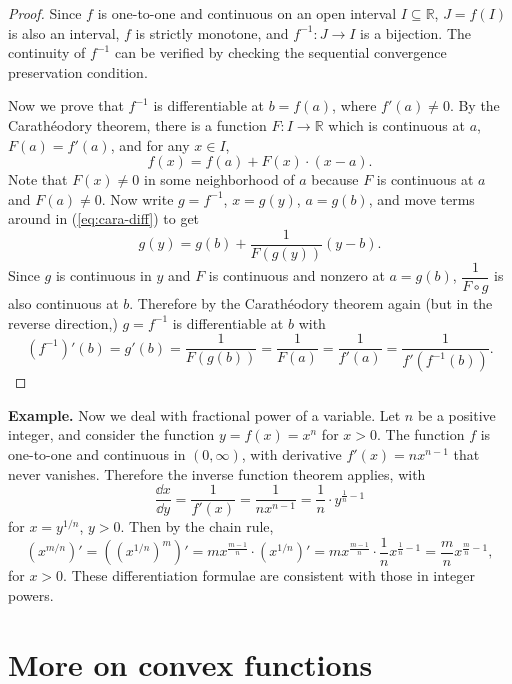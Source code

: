 \begin{proof}
  Since $f$ is one-to-one and continuous on an open interval $I \subseteq \mathbb{R}$,
  $J = f(I)$ is also an interval, $f$ is strictly monotone, and $f^{-1} : J \to I$ is a bijection.
  The continuity of $f^{-1}$ can be verified by checking the sequential convergence preservation condition.

  Now we prove that $f^{-1}$ is differentiable at $b = f(a)$, where $f'(a) \ne 0$.
  By the Carath\'eodory theorem, there is a function $F: I \to \mathbb{R}$ which is continuous at $a$, $F(a) = f'(a)$, and for any $x \in I$,
  \begin{equation}
    \label{eq:cara-diff}
    f(x) = f(a) + F(x) \cdot (x-a).
  \end{equation}
  Note that $F(x) \ne 0$ in some neighborhood of $a$ because $F$ is continuous at $a$ and $F(a) \ne 0$.
  Now write $g = f^{-1}$, $x = g(y)$, $a = g(b)$, and move terms around in (\ref{eq:cara-diff}) to get
  \begin{equation}
    \label{eq:cara-diff2}
    g(y) = g(b) + \frac{1}{F(g(y))} (y - b).
  \end{equation}
  Since $g$ is continuous in $y$ and $F$ is continuous and nonzero at $a = g(b)$, $\dfrac{1}{F \circ g}$ is also continuous at $b$.
  Therefore by the Carath\'eodory theorem again (but in the reverse direction,) $g = f^{-1}$ is differentiable at $b$ with
  \[
    (f^{-1})'(b) = g'(b) = \frac{1}{F(g(b))} = \frac{1}{F(a)} = \frac{1}{f'(a)} = \frac{1}{f'(f^{-1}(b))}.
  \]
\end{proof}

\noindent\textbf{Example.} Now we deal with fractional power of a variable.
Let $n$ be a positive integer, and consider the function $y = f(x) = x^n$ for $x > 0$.
The function $f$ is one-to-one and continuous in $(0, \infty)$, with derivative $f'(x) = n x^{n-1}$ that never vanishes.
Therefore the inverse function theorem applies, with
\[
\frac{\dd x}{\dd y} = \frac{1}{f'(x)} = \frac{1}{n x^{n-1}} = \frac{1}{n} \cdot y^{\frac{1}{n}-1}
\]
for $x = y^{1/n}$, $y > 0$.
Then by the chain rule,
\[
  (x^{m/n})' = ( (x^{1/n})^m )' = m x^{\frac{m-1}{n}} \cdot (x^{1/n})'
  = m x^{\frac{m-1}{n}} \cdot \frac{1}{n} x^{\frac{1}{n}-1} 
  = \frac{m}{n} x^{\frac{m}{n} - 1},
\]
for $x > 0$.
These differentiation formulae are consistent with those in integer powers.

\section{More on convex functions}
\label{sec:convex-diff}

